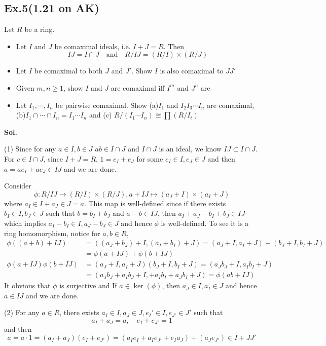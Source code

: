 \documentclass[lang=en,11pt,a4paper,citestyle =authoryear]{elegantpaper}
\begin{document}
\subsection*{Ex.5(1.21 on AK)} 
Let $R$ be a ring.
\begin{itemize}
    \item Let $I$ and $J$ be comaximal ideals, i.e. $I+J = R$. Then
        \[IJ = I\cap J\quad\text{and}\quad R/IJ = (R/I)\times (R/J)\]
    \item Let $I$ be comaximal to both $J$ and $J'$. Show $I$ is also comaximal to $JJ'$
    \item Given $m,n\geq 1$, show $I$ and $J$ are comaximal iff $I^m$ and $J^n$ are
    \item Let $I_1,\cdots,I_n$ be pairwise comaximal. Show (a)$I_1$ and $I_2I_3\cdots I_n$ are comaximal, (b)$I_1\cap\cdots\cap I_n = I_1\cdots I_n$ and (c) $R/(I_1\cdots I_n) \cong \prod (R/I_i)$
\end{itemize}
\vspace{0.5em}
\textbf{Sol.} \par
(1) Since for any $a\in I, b\in J$ $ab\in I\cap J$ and $I\cap J$ is an ideal, we know $IJ \subset I\cap J$. For $c\in I \cap J$, since $I+J = R$, $1 = e_I+e_J$ for some $e_I\in I, e_J\in J$ and then $a = ae_I + ae_J \in IJ$ and we are done.\par
Consider 
\[
\phi:R/IJ \to (R/I) \times (R/J), a+IJ\mapsto (a_J+I)\times (a_I+J)
\]
where $a_I\in I + a_J\in J = a$. This map is well-defined since if there exists $b_I\in I, b_J\in J$ such that $b = b_I+b_J$ and $a-b\in IJ$, then $a_I+a_J - b_I+b_J \in IJ$ which implies $a_I-b_I \in I, a_J-b_J \in J$ and hence $\phi$ is well-defined. To see it is a ring homomorphism, notice for $a,b\in R$,
\[
\begin{aligned}
    \phi((a+b)+IJ) &= ((a_J+b_J)+I,(a_I+b_I)+J) = (a_J+I,a_I+J)+(b_J+I,b_I+J)\\ &= \phi(a+IJ)+\phi(b+IJ) \\
    \phi(a+IJ)\phi(b+IJ) &= (a_J+I,a_I+J)(b_J+I,b_I+J) = (a_Jb_J + I, a_Ib_I+J)\\ &= (a_Jb_J+a_Ib_J+I,+a_Ib_I+a_Jb_I+J) = \phi(ab+IJ) 
\end{aligned}
\]
It obvious that $\phi$ is surjective and If $a\in \ker(\phi)$, then $a_J\in I, a_I\in J$ and hence $a\in IJ$ and we are done.\par
(2) For any $a\in R$, there exists $a_I\in I,a_J\in J,e_{I}'\in I,e_{J'}\in J'$ such that 
\[a_I+a_J = a,\quad e_I+e_{J'} = 1\]
and then
\[
a = a\cdot 1 = (a_I+a_J)(e_I+e_{J'}) = (a_Ie_I+a_Ie_{J'}+e_Ia_J) + (a_Je_{J'}) \in I+JJ'
\]
\end{document}
